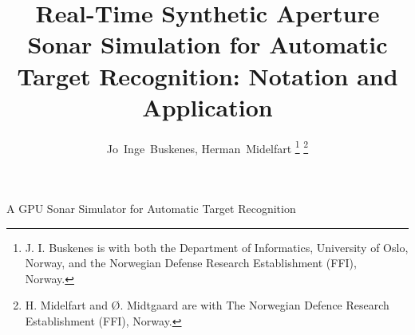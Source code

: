 
\suppressfloats


\title{Real-Time Synthetic Aperture Sonar Simulation for Automatic Target Recognition: Notation and Application}

\author{{Jo~Inge~Buskenes, %
        Herman~Midelfart%
        } %
\thanks{J. I. Buskenes is with both the Department of Informatics, University of Oslo, Norway, and the Norwegian Defense Research Establishment (FFI), Norway.}%
\thanks{H. Midelfart and \O. Midtgaard are with The Norwegian Defence Research Establishment (FFI), Norway.}%
}

%
{A GPU Sonar Simulator for Automatic Target Recognition}




